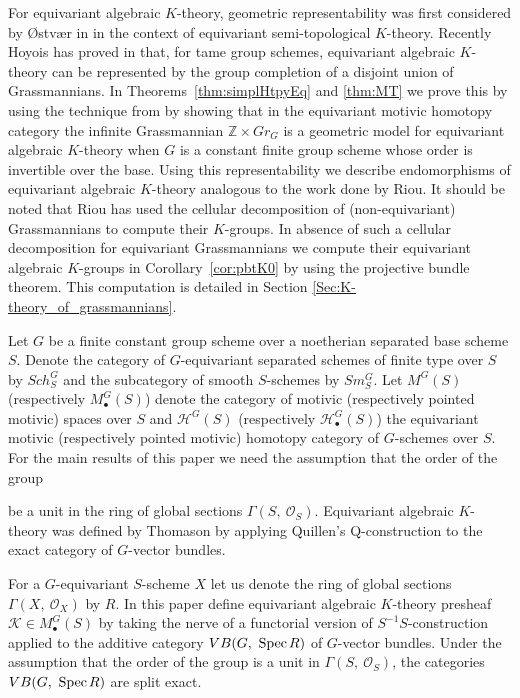 \documentclass[11pt,twoside]{amsart}
\theoremstyle{definition}
\theoremstyle{remark}
\numberwithin{equation}{section}
\newcommand{\mc}{\mathcal}
\newcommand{\ZZ}{\mathbb{Z}}
\newcommand{\spec}{\mathrm{Spec\hskip .5mm }}
\begin{document}
For equivariant algebraic $K$-theory, geometric representability was first considered by \O stv\ae r in \cite{O14} in the context of equivariant semi-topological $K$-theory. Recently Hoyois has proved in  \cite{H20} that, for tame group schemes, equivariant algebraic $K$-theory can be represented by the group completion of a disjoint union of Grassmannians.
In Theorems~\ref{thm:simplHtpyEq} and \ref{thm:MT} 
we prove this by using the technique from \cite{ST15} by showing that in the equivariant motivic homotopy category the infinite Grassmannian $\ZZ\times Gr_G$ is a geometric model for equivariant algebraic $K$-theory when $G$ is a constant finite group scheme whose order is invertible over the base. Using this representability we describe endomorphisms of equivariant algebraic $K$-theory analogous to the work done by Riou. It should be noted that Riou has used the cellular decomposition of (non-equivariant) Grassmannians to compute their $K$-groups. In absence of such a cellular decomposition for equivariant Grassmannians we compute their equivariant algebraic $K$-groups in Corollary~\ref{cor:pbtK0} by using the projective bundle theorem.  
This computation is detailed in Section \ref{Sec:K-theory_of_grassmannians}.


Let $G$ be a finite constant group scheme over a noetherian separated base scheme $S$. Denote the category  of $G$-equivariant separated schemes of finite type over $S$ by $Sch^G_S$  and  the  subcategory of smooth $S$-schemes by $Sm^G_S$. Let $M^G(S)$ (respectively $M^G_\bullet(S)$) denote the category of motivic (respectively pointed motivic) spaces over $S$ and $\mc{H}^G(S)$ (respectively $\mc{H}^G_\bullet(S)$) the equivariant motivic (respectively pointed motivic) homotopy category of $G$-schemes over $S$. For the main results of this paper we need the assumption that  the order of the group

be a unit in the ring of global sections $\Gamma(S,\ \mc{O}_S)$. Equivariant algebraic $K$-theory was defined by Thomason by applying Quillen's Q-construction to the exact category of $G$-vector  bundles. 

For a $G$-equivariant $S$-scheme $X$ let us denote the ring of global sections $\Gamma (X,\ \mc{O}_X)$ by $R$. In this paper define equivariant algebraic $K$-theory presheaf $\mathcal{K}\in M^G_\bullet(S)$ by taking the nerve of a functorial version of $S^{-1}S$-construction applied to the additive category $VB(G,\ \spec R)$ of $G$-vector  bundles. Under the assumption that the order of the group is a unit in $\Gamma(S,\ \mc{O}_S)$,
the categories $VB(G,\ \spec R)$ are split exact.
\end{document}
